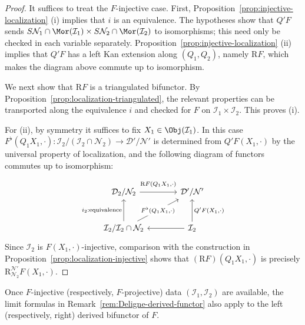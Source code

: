 \begin{proof}
	It suffices to treat the $F$-injective case. First,
	Proposition~\ref{prop:injective-localization} (i) implies that $i$ is an
	equivalence. The hypotheses show that $Q'F$ sends
	$S\mathcal{N}_1\cap\Mor(\mathcal{I}_1)\times
	S\mathcal{N}_2\cap\Mor(\mathcal{I}_2)$ to isomorphisms; this need only be
	checked in each variable separately. Proposition~\ref{prop:injective-localization}
	(ii) implies that $Q'F$ has a left Kan extension along $(Q_1,Q_2)$, namely
	$\mathrm{R}F$, which makes the diagram above commute up to isomorphism.

	We next show that $\mathrm{R}F$ is a triangulated bifunctor. By
	Proposition~\ref{prop:localization-triangulated}, the relevant properties
	can be transported along the equivalence $i$ and checked for $F$ on
	$\mathcal{I}_1\times\mathcal{I}_2$. This proves (i).

	For (ii), by symmetry it suffices to fix
	$X_1\in\Obj(\mathcal{I}_1)$. In this case
	$F^\flat(Q_1X_1,\cdot):
	\mathcal{I}_2/(\mathcal{I}_2\cap\mathcal{N}_2)
	\to\mathcal{D}'/\mathcal{N}'$ is determined from $Q'F(X_1,\cdot)$ by the
	universal property of localization, and the following diagram of functors
	commutes up to isomorphism:
	\[\begin{tikzcd}[column sep=large, row sep=large]
		\mathcal{D}_2 / \mathcal{N}_2 \arrow[r, "{\mathrm{R}F(Q_1 X_1, \cdot)}" inner sep=0.6em] & \mathcal{D}'/ \mathcal{N}' \\
		\mathcal{I}_2 / \mathcal{I}_2 \cap \mathcal{N}_2 \arrow[u, "{i_2: \text{equivalence}}"] \arrow[ru, "{F^\flat(Q_1 X_1, \cdot)}" description] & \mathcal{I}_2 \arrow[l] \arrow[u, "{Q' F(X_1, \cdot)}"']
	\end{tikzcd}\]
	Since $\mathcal{I}_2$ is $F(X_1,\cdot)$-injective, comparison with the
	construction in Proposition~\ref{prop:localization-injective} shows that
	$(\mathrm{R}F)(Q_1X_1,\cdot)$ is precisely
	$\mathrm{R}^{\mathcal{N}'}_{\mathcal{N}_2}F(X_1,\cdot)$.
\end{proof}

Once $F$-injective (respectively, $F$-projective) data
$(\mathcal{I}_1,\mathcal{I}_2)$ are available, the limit formulas in
Remark~\ref{rem:Deligne-derived-functor} also apply to the left (respectively,
right) derived bifunctor of $F$.
